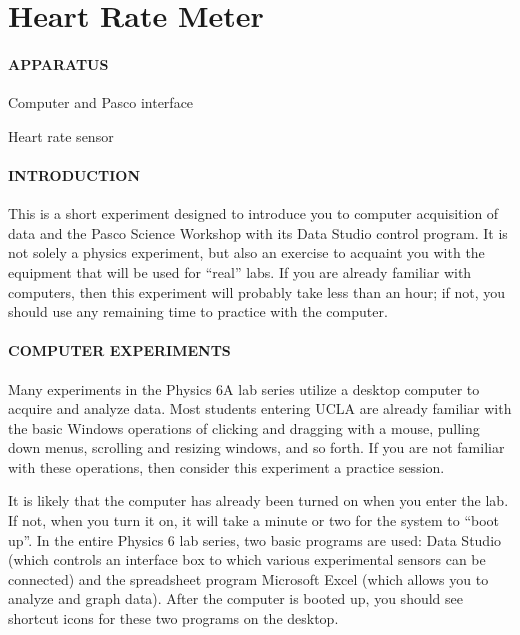 
\vspace{-5ex}\part*{Heart Rate Meter}

\subsection*{APPARATUS}

\vspace{-0.5ex}
\vphantom{.}
\squishlist
\item Computer and Pasco interface
\item Heart rate sensor
\squishend

\subsection*{INTRODUCTION}

This is a short experiment designed to introduce you to computer acquisition of data and the Pasco Science Workshop with its Data Studio control program.  It is not solely a physics experiment, but also an exercise to acquaint you with the equipment that will be used for ``real'' labs.  If you are already familiar with computers, then this experiment will probably take less than an hour; if not, you should use any remaining time to practice with the computer.

\subsection*{COMPUTER EXPERIMENTS}

Many experiments in the Physics 6A lab series utilize a desktop computer to acquire and analyze data.  Most students entering UCLA are already familiar with the basic Windows operations of clicking and dragging with a mouse, pulling down menus, scrolling and resizing windows, and so forth.  If you are not familiar with these operations, then consider this experiment a practice session.

It is likely that the computer has already been turned on when you enter the lab.  If not, when you turn it on, it will take a minute or two for the system to ``boot up''.  In the entire Physics 6 lab series, two basic programs are used: Data Studio (which controls an interface box to which various experimental sensors can be connected) and the spreadsheet program Microsoft Excel (which allows you to analyze and graph data).  After the computer is booted up, you should see shortcut icons for these two programs on the desktop.

